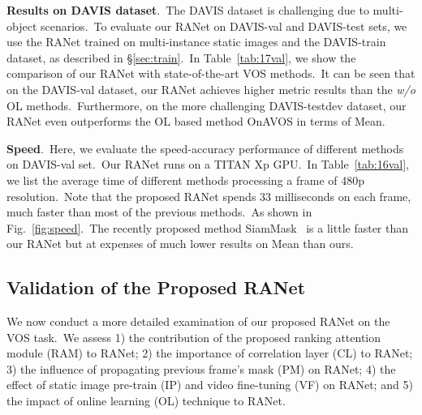 \documentclass[10pt,twocolumn,letterpaper]{article}
\begin{document}
\noindent
\textbf{Results on DAVIS dataset}.\ The DAVIS dataset is challenging due to multi-object scenarios.\ To evaluate our RANet on DAVIS-val and DAVIS-test sets, we use the RANet trained on multi-instance static images and the DAVIS-train dataset, as described in \S\ref{sec:train}.\ In Table~\ref{tab:17val}, we show the comparison of our RANet with state-of-the-art VOS methods.\ It can be seen that on the DAVIS-val dataset, our RANet achieves higher metric results than the \emph{w/o} OL methods.\ Furthermore, on the more challenging DAVIS-testdev dataset, our RANet even outperforms the OL based method OnAVOS in terms of  Mean.




\noindent
\textbf{Speed}.\
Here, we evaluate the speed-accuracy performance of different methods on DAVIS-val set.\ Our RANet runs on a TITAN Xp GPU.\ In Table~\ref{tab:16val}, we list the average time of different methods processing a frame of 480p resolution.\ Note that the proposed RANet spends 33 milliseconds on each frame, much faster than most of the previous methods.\ As shown in Fig.~\ref{fig:speed}.\ The recently proposed method SiamMask~\cite{siammask} is a little faster than our RANet but at expenses of much lower results on  Mean than ours.\ 






\subsection{Validation of the Proposed RANet}
\label{sec:ablation}

We now conduct a more detailed examination of our proposed RANet on the VOS task.\ We assess 1) the contribution of the proposed ranking attention module (RAM) to RANet; 2) the importance of correlation layer (CL) to RANet; 3) the influence of propagating previous frame's mask (PM) on RANet; 4) the effect of static image pre-train (IP) and video fine-tuning (VF) on RANet; and 5) the impact of online learning (OL) technique to RANet.
\end{document}
